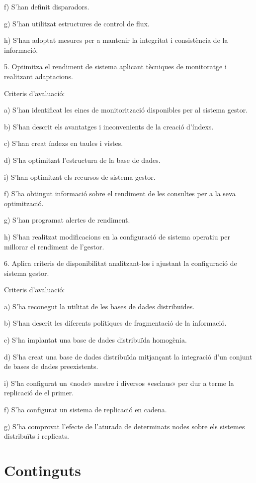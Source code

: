 \documentclass[catalan, a4paper, 12pt, titlepage]{article}
\begin{document}
f) S'han definit disparadors.

g) S'han utilitzat estructures de control de flux.

h) S'han adoptat mesures per a mantenir la integritat i consistència de la informació.

5. Optimitza el rendiment de sistema aplicant tècniques de monitoratge i realitzant adaptacions.

Criteris d'avaluació:

a) S'han identificat les eines de monitorització disponibles per al sistema gestor.

b) S'han descrit els avantatges i inconvenients de la creació d'índexs.

c) S'han creat índexs en taules i vistes.

d) S'ha optimitzat l'estructura de la base de dades.

i) S'han optimitzat els recursos de sistema gestor.

f) S'ha obtingut informació sobre el rendiment de les consultes per a la seva optimització.

g) S'han programat alertes de rendiment.

h) S'han realitzat modificacions en la configuració de sistema operatiu per millorar el rendiment de l'gestor.

6. Aplica criteris de disponibilitat analitzant-los i ajustant la configuració de sistema gestor.

Criteris d'avaluació:

a) S'ha reconegut la utilitat de les bases de dades distribuïdes.

b) S'han descrit les diferents polítiques de fragmentació de la informació.

c) S'ha implantat una base de dades distribuïda homogènia.

d) S'ha creat una base de dades distribuïda mitjançant la integració d'un conjunt de bases de dades preexistents.

i) S'ha configurat un «node» mestre i diversos «esclaus» per dur a terme la replicació de el primer.

f) S'ha configurat un sistema de replicació en cadena.

g) S'ha comprovat l'efecte de l'aturada de determinats nodes sobre els sistemes distribuïts i replicats.

\section{Continguts}
\end{document}
